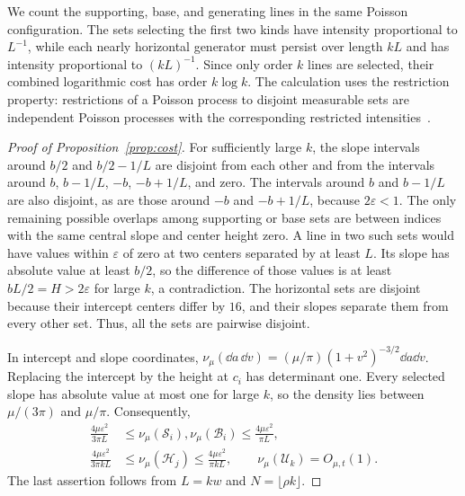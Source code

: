 \documentclass[11pt,letterpaper]{article}
\begin{document}
We count the supporting, base, and generating lines in the same Poisson configuration. The sets selecting the first two kinds have intensity proportional to $L^{-1}$, while each nearly horizontal generator must persist over length $kL$ and has intensity proportional to $(kL)^{-1}$. Since only order $k$ lines are selected, their combined logarithmic cost has order $k\log k$. The calculation uses the restriction property: restrictions of a Poisson process to disjoint measurable sets are independent Poisson processes with the corresponding restricted intensities~\cite[Theorem~5.2]{LP17}.

\begin{proof}[Proof of Proposition~\ref{prop:cost}]
For sufficiently large $k$, the slope intervals around $b/2$ and $b/2-1/L$ are disjoint from each other and from the intervals around $b$, $b-1/L$, $-b$, $-b+1/L$, and zero. The intervals around $b$ and $b-1/L$ are also disjoint, as are those around $-b$ and $-b+1/L$, because $2\varepsilon<1$. The only remaining possible overlaps among supporting or base sets are between indices with the same central slope and center height zero. A line in two such sets would have values within $\varepsilon$ of zero at two centers separated by at least $L$. Its slope has absolute value at least $b/2$, so the difference of those values is at least $bL/2=H>2\varepsilon$ for large $k$, a contradiction. The horizontal sets are disjoint because their intercept centers differ by $16$, and their slopes separate them from every other set. Thus, all the sets are pairwise disjoint.

In intercept and slope coordinates, $\nu_\mu(\dd a\,\dd v)=(\mu/\pi)(1+v^2)^{-3/2}\dd a\dd v$. Replacing the intercept by the height at $c_i$ has determinant one. Every selected slope has absolute value at most one for large $k$, so the density lies between $\mu/(3\pi)$ and $\mu/\pi$. Consequently,
\begin{equation}\label{eq:areas}
\begin{aligned}
 \frac{4\mu\varepsilon^2}{3\pi L}
 &\le\nu_\mu(\mathscr S_i),\nu_\mu(\mathscr B_i)
                         \le\frac{4\mu\varepsilon^2}{\pi L},\\
 \frac{4\mu\varepsilon^2}{3\pi kL}
 &\le\nu_\mu(\mathscr H_j)\le\frac{4\mu\varepsilon^2}{\pi kL},
 \qquad \nu_\mu(\mathscr U_k)=O_{\mu,t}(1).
\end{aligned}
\end{equation}
The last assertion follows from $L=kw$ and $N=\lfloor\rho k\rfloor$.


\end{proof}
\end{document}
